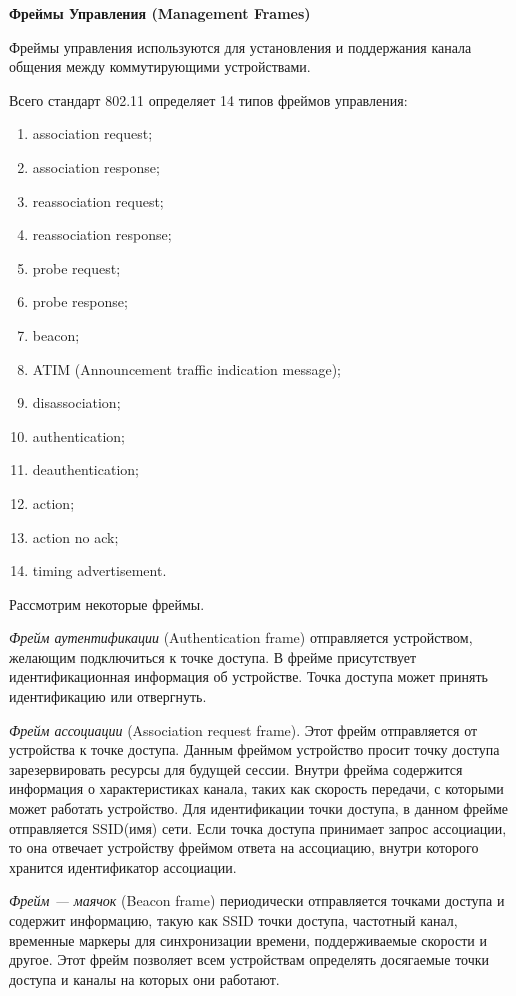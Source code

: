 \textbf{Фреймы Управления (Management Frames)}

Фреймы управления используются для установления и поддержания канала общения между коммутирующими устройствами.

Всего стандарт 802.11 определяет 14 типов фреймов управления:

\begin{enumerate}
	\item association request;
	\item association response;
	\item reassociation request;
	\item reassociation response;
	\item probe request;
	\item probe response;
	\item beacon;
	\item ATIM (Announcement traffic indication message);
	\item disassociation;
	\item authentication;
	\item deauthentication;
	\item action;
	\item action no ack;
	\item timing advertisement.
\end{enumerate}

Рассмотрим некоторые фреймы.

\textit{Фрейм аутентификации} (Authentication frame) отправляется устройством, желающим подключиться к точке доступа. В фрейме присутствует идентификационная информация об устройстве. Точка доступа может принять идентификацию или отвергнуть.

\textit{Фрейм ассоциации} (Association request frame). Этот фрейм отправляется от устройства к точке доступа. Данным фреймом устройство просит точку доступа зарезервировать ресурсы для будущей сессии. Внутри фрейма содержится информация о характеристиках канала, таких как скорость передачи, с которыми может работать устройство. Для идентификации точки доступа, в данном фрейме отправляется SSID(имя) сети. Если точка доступа принимает запрос ассоциации, то она отвечает устройству фреймом ответа на ассоциацию, внутри которого хранится идентификатор ассоциации.

\textit{Фрейм --- маячок} (Beacon frame) периодически отправляется точками доступа и содержит информацию, такую как SSID точки доступа, частотный канал, временные маркеры для синхронизации времени, поддерживаемые скорости и другое. Этот фрейм позволяет всем устройствам определять досягаемые точки доступа и каналы на которых они работают.

